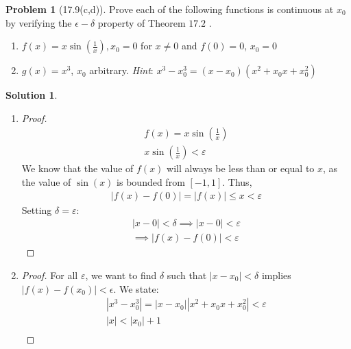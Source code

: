 \documentclass[12pt]{article}
\theoremstyle{definition} %
\newtheorem{solution}{Solution}
\newtheorem{problem}{Problem}
\theoremstyle{plain} %
\begin{document}
\begin{problem}[17.9(c,d)]
   Prove each of the following functions is continuous at \(x_{0}\) by verifying
the \(\epsilon-\delta\) property of Theorem \(17.2\) .
   \begin{enumerate}
   \item \(f(x)=x\sin \left( \frac{1}{x} \right) ,x_{0} =0\) for \(x\neq 0\) and \(f(0)=0\), \(x_{0}=0 \)
   \item \(g(x)=x^{3} \), \(x_{0}   \) arbitrary. \emph{Hint}: \(x^{3} -x^{3}_{0}=(x-x_{0} )(x^{2}+x_{0}x+x_{0}^{2}) \) 

   \end{enumerate} 
\end{problem}
\begin{solution}
   \begin{enumerate}
    \item \begin{proof}
      \begin{align}
        f(x)=x\sin \left(  \frac{1}{x}\right)\\[10pt] 
        x\sin \left( \frac{1}{x} \right) <\varepsilon
      \end{align}
      We know that the value of \(f(x)\) will always be less than or equal to \(x\), as the value of \(\sin(x)\) is bounded from \([-1,1]\). Thus,
      \begin{align}
         \left\vert f(x)-f(0) \right\vert =\left\vert f({x}) \right\vert \leq x<\varepsilon
      \end{align}
      Setting \(\delta =\varepsilon\):
      \begin{align}
         \left\vert x-0 \right\vert <\delta \implies \left\vert x- 0 \right\vert < \varepsilon \\[10pt] 
         \implies \left\vert f(x)-f(0) \right\vert < \varepsilon
      \end{align}
    \end{proof}
  \item \begin{proof}
  For all \(\varepsilon\), we want to find \(\delta\) such that \(\left\vert x-x_0 \right\vert <\delta \) implies \(\left\vert f(x)-f(x_0) \right\vert <\epsilon\). We state: 
      \begin{align}
        \left\vert x^{3}-x_0^{3} \right\vert =\left\vert x-x_0 \right\vert \left\vert x^{2}+x_{0}x+x_{0}^{2}  \right\vert <\varepsilon \\[10pt] 
        \left\vert x \right\vert <\left\vert x_0 \right\vert +1 \\[10pt] 

\end{align}
\end{proof}
\end{enumerate}
\end{solution}
\end{document}
